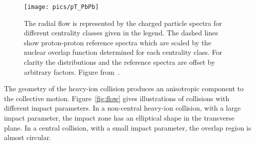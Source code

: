 





\begin{figure}[b!]
\centering
\texttt{[image: pics/pT\_PbPb]}
\caption[Charged particle spectra]{The radial flow is represented by the charged particle spectra for different centrality classes given in the legend. The dashed lines show  proton-proton reference spectra which are scaled by the nuclear overlap function determined for each centrality class.  For clarity the distributions and the reference spectra are offset by arbitrary factors. Figure from~\cite{PRL106032301}.}
\label{fig:dndpt}
\end{figure}


The geometry of the heavy-ion collision produces an anisotropic component to the collective motion. Figure~\ref{fig:flow} gives illustrations of collisions with different impact parameters. In a non-central heavy-ion collision, with a large impact parameter, the impact zone has an elliptical shape in the transverse plane. In a central collision, with a small impact parameter, the overlap region is almost circular.

